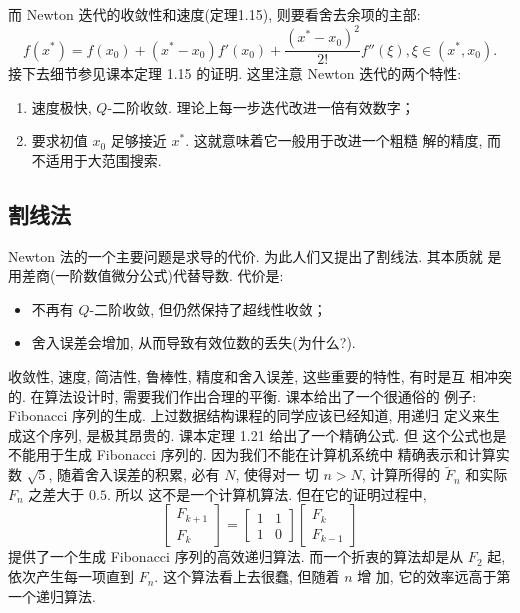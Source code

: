 \documentclass[a4paper]{ctexart}
\begin{document}
而 Newton 迭代的收敛性和速度(定理1.15), 则要看舍去余项的主部:
\[
  f(x^*) = f(x_0) + (x^* - x_0) f'(x_0) + \frac{(x^* -
    x_0)^2}{2!}f''(\xi), \xi \in (x^*, x_0).
\]
接下去细节参见课本定理 1.15 的证明. 这里注意 Newton 迭代的两个特性:
\begin{enumerate}
\item 速度极快, $Q$-二阶收敛. 理论上每一步迭代改进一倍有效数字；
\item 要求初值 $x_0$ 足够接近 $x^*$. 这就意味着它一般用于改进一个粗糙
  解的精度, 而不适用于大范围搜索.
\end{enumerate}

\subsection{割线法}

Newton 法的一个主要问题是求导的代价. 为此人们又提出了割线法. 其本质就
是用差商(一阶数值微分公式)代替导数. 代价是:
\begin{itemize}
\item 不再有 $Q$-二阶收敛, 但仍然保持了超线性收敛；
\item 舍入误差会增加, 从而导致有效位数的丢失(为什么?).
\end{itemize}
收敛性, 速度, 简洁性, 鲁棒性, 精度和舍入误差, 这些重要的特性, 有时是互
相冲突的. 在算法设计时, 需要我们作出合理的平衡. 课本给出了一个很通俗的
例子: Fibonacci 序列的生成. 上过数据结构课程的同学应该已经知道, 用递归
定义来生成这个序列, 是极其昂贵的. 课本定理 1.21 给出了一个精确公式. 但
这个公式也是不能用于生成 Fibonacci 序列的. 因为我们不能在计算机系统中
精确表示和计算实数 $\sqrt{5}$, 随着舍入误差的积累, 必有 $N$, 使得对一
切 $n > N$, 计算所得的 $\tilde{F}_n$ 和实际 $F_n$ 之差大于 $0.5$. 所以
这不是一个计算机算法. 但在它的证明过程中,
\[
  \left[\begin{array}{c}F_{k + 1} \\ F_k\end{array}\right]
  = \left[\begin{array}{cc}1 & 1 \\ 1 & 0\end{array}\right]
  \left[\begin{array}{c}F_k \\ F_{k - 1}\end{array}\right]
\]
提供了一个生成 Fibonacci 序列的高效递归算法. 而一个折衷的算法却是从
$F_2$ 起, 依次产生每一项直到 $F_n$. 这个算法看上去很蠢, 但随着 $n$ 增
加, 它的效率远高于第一个递归算法.
\end{document}
